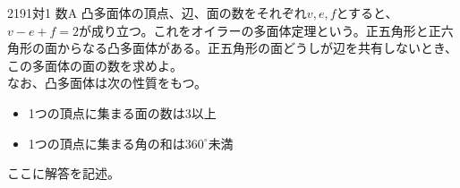 \begin{prob}{219}{}{1対1 数A}
 凸多面体の頂点、辺、面の数をそれぞれ$v, e, f$とすると、$v-e+f=2$が成り立つ。これをオイラーの多面体定理という。正五角形と正六角形の面からなる凸多面体がある。正五角形の面どうしが辺を共有しないとき、この多面体の面の数を求めよ。\\
 なお、凸多面体は次の性質をもつ。
 \begin{itemize}
  \item 1つの頂点に集まる面の数は3以上
  \item 1つの頂点に集まる角の和は$360^\circ$未満
 \end{itemize}
\end{prob}

ここに解答を記述。